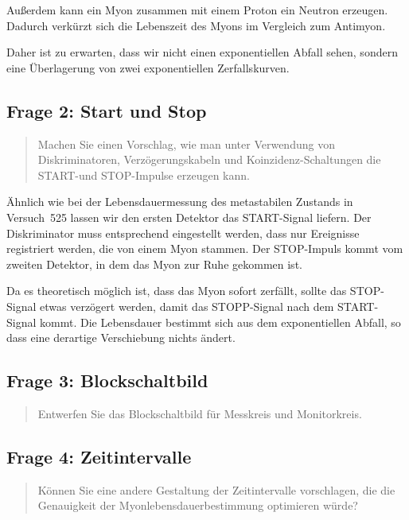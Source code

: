 \documentclass[11pt, ngerman, fleqn, DIV=15, headinclude, BCOR=2cm]{scrreprt}
\begin{document}
Außerdem kann ein Myon zusammen mit einem Proton ein Neutron erzeugen. Dadurch
verkürzt sich die Lebenszeit des Myons im Vergleich zum Antimyon.
\parencite{Rennie/Myon_Decay}

Daher ist zu erwarten, dass wir nicht einen exponentiellen Abfall sehen,
sondern eine Überlagerung von zwei exponentiellen Zerfallskurven.

\subsection{Frage 2: Start und Stop}

\begin{quote}
    Machen Sie einen Vorschlag, wie man unter Verwendung von Diskriminatoren,
    Verzögerungskabeln und Koinzidenz-Schaltungen die START-und STOP-Impulse
    erzeugen kann.
\end{quote}

Ähnlich wie bei der Lebensdauermessung des metastabilen Zustands in Versuch~525
lassen wir den ersten Detektor das START-Signal liefern. Der Diskriminator muss
entsprechend eingestellt werden, dass nur Ereignisse registriert werden, die
von einem Myon stammen. Der STOP-Impuls kommt vom zweiten Detektor, in dem das
Myon zur Ruhe gekommen ist.

Da es theoretisch möglich ist, dass das Myon sofort zerfällt, sollte das
STOP-Signal etwas verzögert werden, damit das STOPP-Signal nach dem
START-Signal kommt. Die Lebensdauer bestimmt sich aus dem exponentiellen
Abfall, so dass eine derartige Verschiebung nichts ändert.

\subsection{Frage 3: Blockschaltbild}

\begin{quote}
    Entwerfen Sie das Blockschaltbild für Messkreis und Monitorkreis.
\end{quote}


\subsection{Frage 4: Zeitintervalle}

\begin{quote}
    Können Sie eine andere Gestaltung der Zeitintervalle vorschlagen, die die
    Genauigkeit der Myonlebensdauerbestimmung optimieren würde?
\end{quote}
\end{document}
